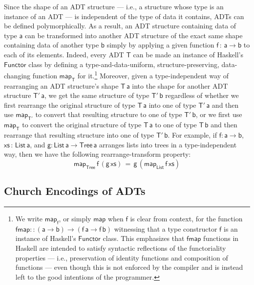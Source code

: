 \documentclass[acmsmall,screen,review,anonymous]{acmart}
\theoremstyle{definition}
\begin{document}
Since the shape of an ADT structure --- i.e., a structure whose type
is an instance of an ADT --- is independent of the type of data it
contains, ADTs can be defined polymorphically. As a result, an ADT
structure containing data of type $\mathsf{a}$ can be transformed into
another ADT structure of the exact same shape containing data of
another type $\mathsf{b}$ simply by applying a given function
$\mathsf{f \,:\,a \to b}$ to each of its elements. Indeed, every ADT
$\mathsf{T}$ can be made an instance of Haskell's $\mathsf{Functor}$
class by defining a type-and-data-uniform, structure-preserving,
data-changing function $\mathsf{map_T}$ for it.\footnote{We write
  $\mathsf{map_f}$, or simply $\mathsf{map}$ when $\mathsf{f}$ is
  clear from context, for the function $\mathsf{fmap :: (a \to b) \to
    (f\,a \to f\,b)}$ witnessing that a type constructor $\mathsf{f}$
  is an instance of Haskell's $\mathsf{Functor}$ class. This
  emphasizes that $\mathsf{fmap}$ functions in Haskell are intended to
  {\color{blue} satisfy syntactic reflections of the functoriality
    properties --- i.e., preservation of identity functions and
    composition of functions --- even though}
%
this is not
  enforced by the compiler and is instead left to the good intentions
  of the programmer.}
Moreover, given a type-independent way of rearranging an ADT
structure's shape $\mathsf{T\,a}$ into the shape for another ADT
structure $\mathsf{T'\,a}$, we get the same structure of type
$\mathsf{T'\,b}$ regardless of whether we first rearrange the original
structure of type $\mathsf{T\,a}$ into one of type $\mathsf{T'\,a}$
and then use $\mathsf{map_{T'}}$ to convert that resulting structure
to one of type $\mathsf{T'\,b}$, or we first use $\mathsf{map_T}$ to
convert the original structure of type $\mathsf{T\,a}$ to one of type
$\mathsf{T\,b}$ and then rearrange that resulting structure into one
of type $\mathsf{T'\,b}$. For example, if $\mathsf{f : a \to b}$,
$\mathsf{xs \,:\,List\,a}$, and $\mathsf{g : List\,a\to Tree\,a}$
arranges lists into trees in a type-independent way, then we have the
following rearrange-transform property:
\[\mathsf{map_{Tree}\,f\,(g \, xs) \,=\, g\,(map_{List}\,f\,xs)}\]

\subsection{Church Encodings of ADTs}
\end{document}
